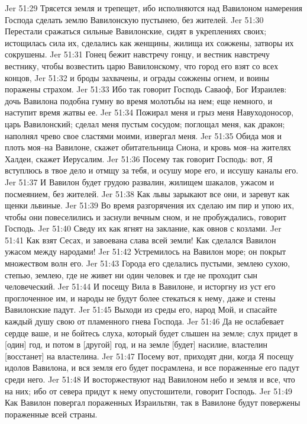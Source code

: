 Jer 51:29  Трясется земля и трепещет, ибо исполняются над Вавилоном намерения Господа сделать землю Вавилонскую пустынею, без жителей.
Jer 51:30  Перестали сражаться сильные Вавилонские, сидят в укреплениях своих; истощилась сила их, сделались как женщины, жилища их сожжены, затворы их сокрушены.
Jer 51:31  Гонец бежит навстречу гонцу, и вестник навстречу вестнику, чтобы возвестить царю Вавилонскому, что город его взят со всех концов,
Jer 51:32  и броды захвачены, и ограды сожжены огнем, и воины поражены страхом.
Jer 51:33  Ибо так говорит Господь Саваоф, Бог Израилев: дочь Вавилона подобна гумну во время молотьбы на нем; еще немного, и наступит время жатвы ее.
Jer 51:34  Пожирал меня и грыз меня Навуходоносор, царь Вавилонский; сделал меня пустым сосудом; поглощал меня, как дракон; наполнял чрево свое сластями моими, извергал меня.
Jer 51:35  Обида моя и плоть моя--на Вавилоне, скажет обитательница Сиона, и кровь моя--на жителях Халдеи, скажет Иерусалим.
Jer 51:36  Посему так говорит Господь: вот, Я вступлюсь в твое дело и отмщу за тебя, и осушу море его, и иссушу каналы его.
Jer 51:37  И Вавилон будет грудою развалин, жилищем шакалов, ужасом и посмеянием, без жителей.
Jer 51:38  Как львы зарыкают все они, и заревут как щенки львиные.
Jer 51:39  Во время разгорячения их сделаю им пир и упою их, чтобы они повеселились и заснули вечным сном, и не пробуждались, говорит Господь.
Jer 51:40  Сведу их как ягнят на заклание, как овнов с козлами.
Jer 51:41  Как взят Сесах, и завоевана слава всей земли! Как сделался Вавилон ужасом между народами!
Jer 51:42  Устремилось на Вавилон море; он покрыт множеством волн его.
Jer 51:43  Города его сделались пустыми, землею сухою, степью, землею, где не живет ни один человек и где не проходит сын человеческий.
Jer 51:44  И посещу Вила в Вавилоне, и исторгну из уст его проглоченное им, и народы не будут более стекаться к нему, даже и стены Вавилонские падут.
Jer 51:45  Выходи из среды его, народ Мой, и спасайте каждый душу свою от пламенного гнева Господа.
Jer 51:46  Да не ослабевает сердце ваше, и не бойтесь слуха, который будет слышен на земле; слух придет в [один] год, и потом в [другой] год, и на земле [будет] насилие, властелин [восстанет] на властелина.
Jer 51:47  Посему вот, приходят дни, когда Я посещу идолов Вавилона, и вся земля его будет посрамлена, и все пораженные его падут среди него.
Jer 51:48  И восторжествуют над Вавилоном небо и земля и все, что на них; ибо от севера придут к нему опустошители, говорит Господь.
Jer 51:49  Как Вавилон повергал пораженных Израильтян, так в Вавилоне будут повержены пораженные всей страны.
